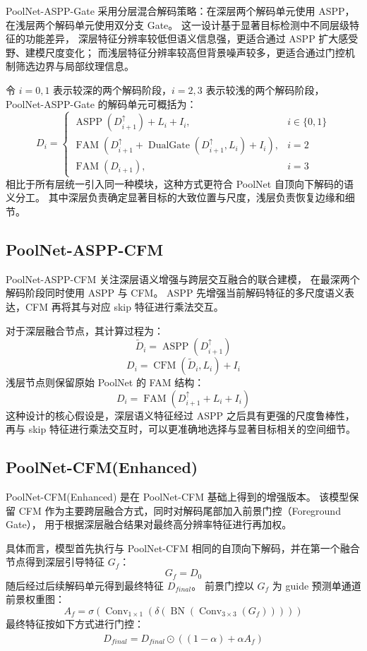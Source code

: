\documentclass[UTF8,a4paper,10pt]{ctexart}
\begin{document}
PoolNet-ASPP-Gate 采用分层混合解码策略：在深层两个解码单元使用 ASPP，
在浅层两个解码单元使用双分支 Gate。
这一设计基于显著目标检测中不同层级特征的功能差异，
深层特征分辨率较低但语义信息强，更适合通过 ASPP 扩大感受野、建模尺度变化；
而浅层特征分辨率较高但背景噪声较多，更适合通过门控机制筛选边界与局部纹理信息。

令 \(i=0,1\) 表示较深的两个解码阶段，\(i=2,3\) 表示较浅的两个解码阶段，
PoolNet-ASPP-Gate 的解码单元可概括为：
\[
D_i =
\begin{cases}
\operatorname{ASPP}(D_{i+1}^{\uparrow}) + L_i + I_i, & i \in \{0,1\}\\
\operatorname{FAM}(D_{i+1}^{\uparrow} + \operatorname{DualGate}(D_{i+1}^{\uparrow},L_i) + I_i), & i = 2\\
\operatorname{FAM}(D_{i+1}), & i = 3
\end{cases}
\]
相比于所有层统一引入同一种模块，这种方式更符合 PoolNet 自顶向下解码的语义分工。
其中深层负责确定显著目标的大致位置与尺度，浅层负责恢复边缘和细节。

\subsection{PoolNet-ASPP-CFM}

PoolNet-ASPP-CFM 关注深层语义增强与跨层交互融合的联合建模，
在最深两个解码阶段同时使用 ASPP 与 CFM。
ASPP 先增强当前解码特征的多尺度语义表达，CFM 再将其与对应 skip 特征进行乘法交互。

对于深层融合节点，其计算过程为：
\[
\tilde{D}_i
=
\operatorname{ASPP}(D_{i+1}^{\uparrow})
\]
\[
D_i
=
\operatorname{CFM}(\tilde{D}_i,L_i)+I_i
\]
浅层节点则保留原始 PoolNet 的 FAM 结构：
\[
D_i
=
\operatorname{FAM}(D_{i+1}^{\uparrow}+L_i+I_i)
\]
这种设计的核心假设是，深层语义特征经过 ASPP 之后具有更强的尺度鲁棒性，
再与 skip 特征进行乘法交互时，可以更准确地选择与显著目标相关的空间细节。

\subsection{PoolNet-CFM(Enhanced)}

PoolNet-CFM(Enhanced) 是在 PoolNet-CFM 基础上得到的增强版本。
该模型保留 CFM 作为主要跨层融合方式，同时对解码尾部加入前景门控（Foreground Gate），
用于根据深层融合结果对最终高分辨率特征进行再加权。

具体而言，模型首先执行与 PoolNet-CFM 相同的自顶向下解码，并在第一个融合节点得到深层引导特征 \(G_f\)：
\[
G_f = D_0
\]
随后经过后续解码单元得到最终特征 \(D_{final}\)。
前景门控以 \(G_f\) 为 guide 预测单通道前景权重图：
\[
A_f
=
\sigma
\left(
\operatorname{Conv}_{1\times1}
\left(
\delta
\left(
\operatorname{BN}
\left(
\operatorname{Conv}_{3\times3}(G_f)
\right)
\right)
\right)
\right)
\]
最终特征按如下方式进行门控：
\[
\hat{D}_{final}
=
D_{final}
\odot
\left(
(1-\alpha)+\alpha A_f
\right)
\]
\end{document}
